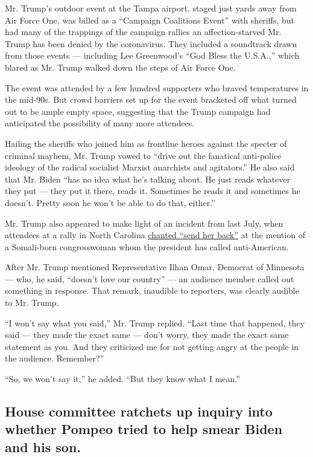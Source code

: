 Mr. Trump's outdoor event at the Tampa airport, staged just yards away
from Air Force One, was billed as a ``Campaign Coalitions Event'' with
sheriffs, but had many of the trappings of the campaign rallies an
affection-starved Mr. Trump has been denied by the coronavirus. They
included a soundtrack drawn from those events --- including Lee
Greenwood's ``God Bless the U.S.A.,'' which blared as Mr. Trump walked
down the steps of Air Force One.

The event was attended by a few hundred supporters who braved
temperatures in the mid-90s. But crowd barriers set up for the event
bracketed off what turned out to be ample empty space, suggesting that
the Trump campaign had anticipated the possibility of many more
attendees.

Hailing the sheriffs who joined him as frontline heroes against the
specter of criminal mayhem, Mr. Trump vowed to ``drive out the fanatical
anti-police ideology of the radical socialist Marxist anarchists and
agitators.'' He also said that Mr. Biden ``has no idea what he's talking
about. He just reads whatever they put --- they put it there, reads it.
Sometimes he reads it and sometimes he doesn't. Pretty soon he won't be
able to do that, either.''

Mr. Trump also appeared to make light of an incident from last July,
when attendees at a rally in North Carolina
\href{https://www.nytimes.com/2019/07/17/us/politics/trump-send-her-back-ilhan-omar.html}{chanted
``send her back''} at the mention of a Somali-born congresswoman whom
the president has called anti-American.

After Mr. Trump mentioned Representative Ilhan Omar, Democrat of
Minnesota --- who, he said, ``doesn't love our country'' --- an audience
member called out something in response. That remark, inaudible to
reporters, was clearly audible to Mr. Trump.

``I won't say what you said,'' Mr. Trump replied. ``Last time that
happened, they said --- they made the exact same --- don't worry, they
made the exact same statement as you. And they criticized me for not
getting angry at the people in the audience. Remember?''

``So, we won't say it,'' he added. ``But they know what I mean.''

\hypertarget{house-committee-ratchets-up-inquiry-into-whether-pompeo-tried-to-help-smear-biden-and-his-son}{%
\subsection{House committee ratchets up inquiry into whether Pompeo
tried to help smear Biden and his
son.}\label{house-committee-ratchets-up-inquiry-into-whether-pompeo-tried-to-help-smear-biden-and-his-son}}

